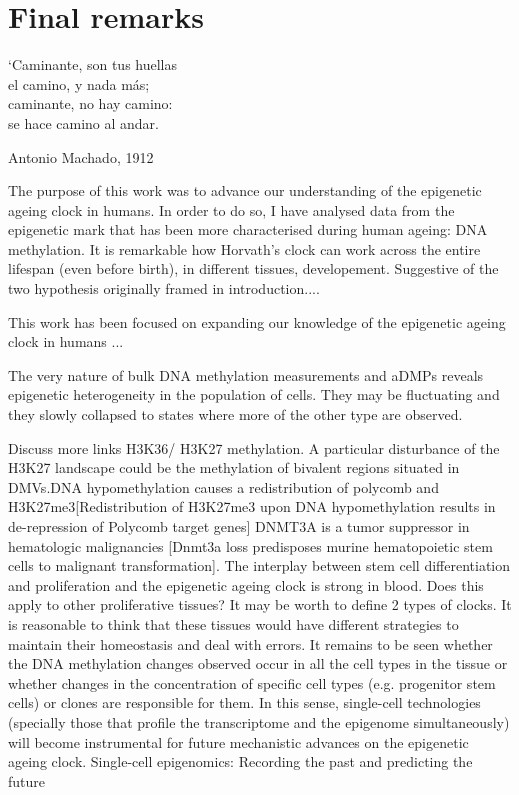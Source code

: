 
\chapter{Final remarks} \label{c:5}

\ifpdf
	\graphicspath{{Chapter5/Figs/pdf/}}
\else
	\graphicspath{{Chapter5/Figs/svg/}}
\fi

\epigraph{`Caminante, son tus huellas \\ el camino, y nada más; \\ caminante, no hay camino: \\ se hace camino al andar.}{Antonio Machado, 1912 \cite{Machado}}

\bigskip

The purpose of this work was to advance our understanding of the epigenetic ageing clock in humans. In order to do so, I have analysed data from the epigenetic mark that has been more characterised during human ageing: DNA methylation. It is remarkable how Horvath's clock can work across the entire lifespan (even before birth), in different tissues, developement. Suggestive of the two hypothesis originally framed in introduction....

This work has been focused on expanding our knowledge of the epigenetic ageing clock in humans ...

The very nature of bulk DNA methylation measurements and aDMPs reveals epigenetic heterogeneity in the population of cells. They may be fluctuating and they slowly collapsed to states where more of the other type are observed. 

Discuss more links H3K36/ H3K27 methylation. A particular disturbance of the H3K27 landscape could be the methylation of bivalent regions situated in DMVs.DNA hypomethylation causes a redistribution of polycomb and H3K27me3[Redistribution of H3K27me3 upon DNA hypomethylation results in de-repression of Polycomb target genes] DNMT3A is a tumor suppressor in hematologic malignancies [Dnmt3a loss predisposes murine hematopoietic stem cells to malignant transformation]. The interplay between stem cell differentiation and proliferation and the epigenetic ageing clock is strong in blood. Does this apply to other proliferative tissues? It may be worth to define 2 types of clocks. It is reasonable to think that these tissues would have different strategies to maintain their homeostasis and deal with errors. 
It remains to be seen whether the DNA methylation changes observed occur in all the cell types in the tissue or whether changes in the concentration of specific cell types (e.g. progenitor stem cells) or clones are responsible for them. In this sense, single-cell technologies (specially those that profile the transcriptome and the epigenome simultaneously)  will become instrumental for future mechanistic advances on the epigenetic ageing clock.
Single-cell epigenomics: Recording the past and predicting the future

